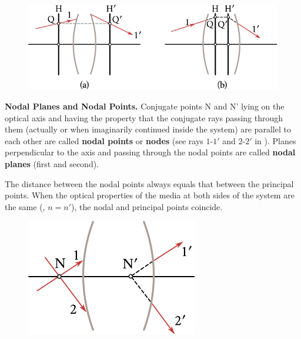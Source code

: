 \begin{figure}[t]
	\begin{center}
		\includegraphics[scale=1]{figures/ch_16/fig_16_16h.pdf}
        \caption[]{}
		\label{fig:16_16}
	\end{center}
	\vspace{-0.7cm}
\end{figure}

\textbf{Nodal Planes and Nodal Points.}
Conjugate points N and N' lying on the optical axis and having the property that the conjugate rays passing through them (actually or when imaginarily continued inside the system) are parallel to each other are called \textbf{nodal points} or \textbf{nodes} (see rays $1$-$1'$ and $2$-$2'$ in ).
Planes perpendicular to the axis and passing through the nodal points are called \textbf{nodal planes} (first and second).

The distance between the nodal points always equals that between the principal points.
When the optical properties of the media at both sides of the system are the same (\ie, $n = n'$), the nodal and principal points coincide.

\begin{figure}[t]
	\begin{center}
		\includegraphics[scale=1]{figures/ch_16/fig_16_17.pdf}
        \caption[]{}
		\label{fig:16_17}
	\end{center}
	\vspace{-0.8cm}
\end{figure}


